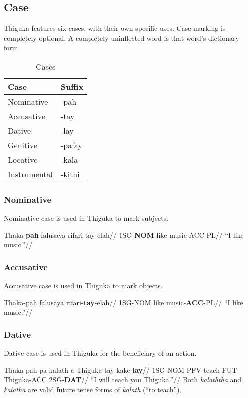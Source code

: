 \newpage{}

\subsection{Case}
Thiguka features six cases, with their own specific uses.
Case marking is completely optional.
A completely uninflected word is that word's dictionary form.

\begin{table}[h!]
    \centering
    \caption{Cases}
    \begin{tabularx}{8cm}{|X|X|}
        \hline
        \textbf{Case} & \textbf{Suffix} \\
        \hline
        Nominative & -pah \\
        Accusative & -tay \\
        Dative & -lay \\
        Genitive & -pafay \\
        Locative & -kala \\
        Instrumental & -kithi \\ 
        \hline
    \end{tabularx}
\end{table}

\subsubsection{Nominative}
Nominative case is used in Thiguka to mark subjects.

\ex
\begingl
\gla Thaka-\textbf{pah} falusaya rifari-tay-elah//
\glb 1SG-\textbf{NOM}   like     music-ACC-PL//
\glft ``I like music.''//
\endgl
\xe

\subsubsection{Accusative}
Accusative case is used in Thiguka to mark objects.

\ex
\begingl
\gla Thaka-pah falusaya rifari-\textbf{tay}-elah//
\glb 1SG-NOM   like     music-\textbf{ACC}-PL//
\glft ``I like music.''//
\endgl
\xe

\subsubsection{Dative}
Dative case is used in Thiguka for the beneficiary of an action.

\ex
\begingl
\gla Thaka-pah pa-kalath-a   Thiguka-tay kake-\textbf{lay}//
\glb 1SG-NOM   PFV-teach-FUT Thiguka-ACC 2SG-\textbf{DAT}//
\glft``I will teach you Thiguka.''//
\endgl
\xe
Both \textit{kalaththa} and \textit{kalatha} are valid future tense forms of \textit{kalath} (``to teach'').

